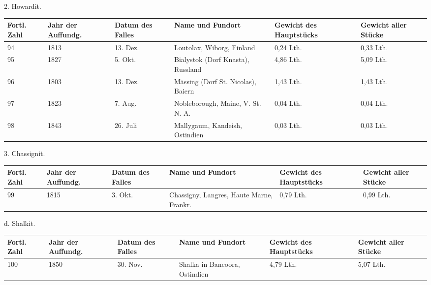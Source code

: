 \documentclass[a4paper, 11pt, oneside]{article}
\begin{document}
\clearpage
\begin{center}
2. Howardit.
\end{center}
\begin{center}
\begin{footnotesize}
\begin{tabular}{ |p{7mm}|p{7mm}|p{13mm}|p{48mm}|p{22mm}|p{22mm}| }
    \hline
    Fortl. Zahl & Jahr der Auffundg. & Datum des Falles & Name und Fundort & Gewicht des Hauptstücks & Gewicht aller Stücke\\
    \hline\hline
    94 & 1813 & 13. Dez. & Loutolax, Wiborg, Finland & 0,24 Lth. & 0,33 Lth.\\\hline
    95 & 1827 & 5. Okt. & Bialystok (Dorf Knasta), Russland & 4,86 Lth. & 5,09 Lth.\\\hline
    96 & 1803 & 13. Dez. & Mässing (Dorf St. Nicolas), Baiern & 1,43 Lth. & 1,43 Lth.\\\hline
    97 & 1823 & 7. Aug. & Nobleborough, Maine, V. St. N. A. & 0,04 Lth. & 0,04 Lth.\\\hline
    98 & 1843 & 26. Juli & Mallygaum, Kandeish, Ostindien & 0,03 Lth. & 0,03 Lth.\\
    \hline
\end{tabular}
\end{footnotesize}
\end{center}
\begin{center}
3. Chassignit.
\end{center}
\begin{center}
\begin{footnotesize}
\begin{tabular}{ |p{7mm}|p{7mm}|p{13mm}|p{48mm}|p{22mm}|p{22mm}| }
    \hline
    Fortl. Zahl & Jahr der Auffundg. & Datum des Falles & Name und Fundort & Gewicht des Hauptstücks & Gewicht aller Stücke\\
    \hline\hline
    99 & 1815 & 3. Okt. & Chassigny, Langres, Haute Marne, Frankr. & 0,79 Lth. & 0,99 Lth.\\
    \hline
\end{tabular}
\end{footnotesize}
\end{center}
\begin{center}
d. Shalkit.
\end{center}
\begin{center}
\begin{footnotesize}
\begin{tabular}{ |p{7mm}|p{7mm}|p{13mm}|p{48mm}|p{22mm}|p{22mm}| }
    \hline
    Fortl. Zahl & Jahr der Auffundg. & Datum des Falles & Name und Fundort & Gewicht des Hauptstücks & Gewicht aller Stücke\\
    \hline\hline
    100 & 1850 & 30. Nov. & Shalka in Bancoora, Ostindien & 4,79 Lth. & 5,07 Lth.\\
    \hline
\end{tabular}
\end{footnotesize}
\end{center}
\end{document}
